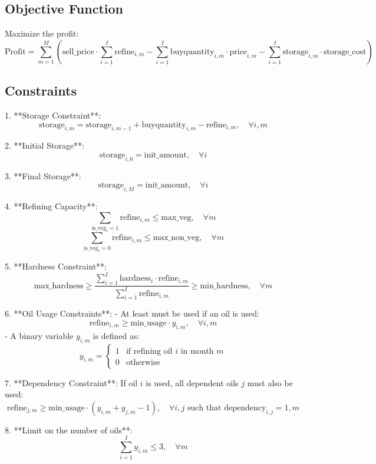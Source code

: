 \documentclass{article}
\begin{document}
\subsection*{Objective Function}
Maximize the profit:
\[
\text{Profit} = \sum_{m=1}^{M} \left( \text{sell\_price} \cdot \sum_{i=1}^{I} \text{refine}_{i,m} - \sum_{i=1}^{I} \text{buyquantity}_{i,m} \cdot \text{price}_{i,m} - \sum_{i=1}^{I} \text{storage}_{i,m} \cdot \text{storage\_cost} \right)
\]

\subsection*{Constraints}
1. **Storage Constraint**:
\[
\text{storage}_{i,m} = \text{storage}_{i,m-1} + \text{buyquantity}_{i,m} - \text{refine}_{i,m}, \quad \forall i, m
\]

2. **Initial Storage**:
\[
\text{storage}_{i,0} = \text{init\_amount}, \quad \forall i
\]

3. **Final Storage**:
\[
\text{storage}_{i,M} = \text{init\_amount}, \quad \forall i
\]

4. **Refining Capacity**:
\[
\sum_{\text{is\_veg}_{i}=1} \text{refine}_{i,m} \leq \text{max\_veg}, \quad \forall m
\]
\[
\sum_{\text{is\_veg}_{i}=0} \text{refine}_{i,m} \leq \text{max\_non\_veg}, \quad \forall m
\]

5. **Hardness Constraint**:
\[
\text{max\_hardness} \geq \frac{\sum_{i=1}^{I} \text{hardness}_{i} \cdot \text{refine}_{i,m}}{\sum_{i=1}^{I} \text{refine}_{i,m}} \geq \text{min\_hardness}, \quad \forall m
\]

6. **Oil Usage Constraints**:
   - At least  must be used if an oil is used:
\[
\text{refine}_{i,m} \geq \text{min\_usage} \cdot y_{i,m}, \quad \forall i, m
\]
   - A binary variable \( y_{i,m} \) is defined as:
\[
y_{i,m} = 
\begin{cases} 
1 & \text{if refining oil } i \text{ in month } m \\
0 & \text{otherwise}
\end{cases}
\]

7. **Dependency Constraint**:
If oil \( i \) is used, all dependent oils \( j \) must also be used:
\[
\text{refine}_{j,m} \geq \text{min\_usage} \cdot (y_{i,m} + y_{j,m} - 1), \quad \forall i, j \text{ such that } \text{dependency}_{i,j} = 1, m
\]

8. **Limit on the number of oils**:
\[
\sum_{i=1}^{I} y_{i,m} \leq 3, \quad \forall m
\]
\end{document}
